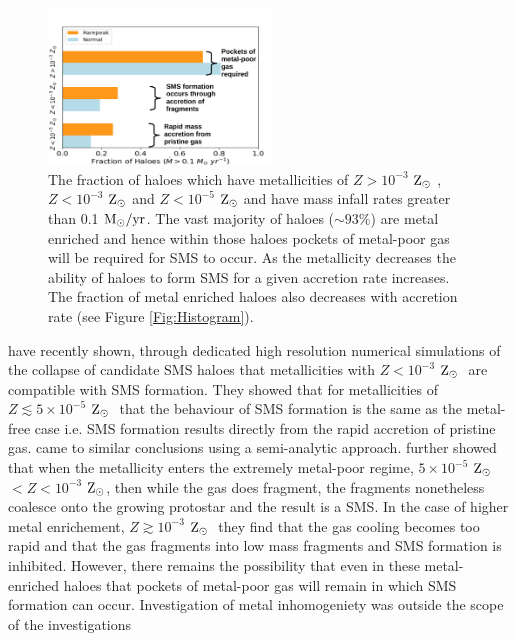 \documentclass[graphics, twocolumn, usenatbib]{mn2e}
\newcommand{\msolaryrc} {$\rm{M_{\odot}/yr}$}
\newcommand{\zsolar} {$\rm{Z_{\odot}}~$}
\newcommand{\zsolarc} {$\rm{Z_{\odot}}$}
\begin{document}
\begin{figure}
   \centering 
\includegraphics[width=0.525\textwidth]{FIGURES/FinalPlot-crop.pdf}
\caption{The fraction of haloes which have metallicities of $Z > 10^{-3}$ \zsolar,
  $Z < 10^{-3}$ \zsolar and $ Z < 10^{-5}$ \zsolar and have mass infall rates greater than
  0.1 \msolaryrc. The vast majority of haloes ($\sim 93$\%) are metal enriched and hence within
  those haloes pockets of metal-poor gas will be required for SMS to occur. As the metallicity
  decreases the ability of haloes to form SMS for a given accretion rate increases. The fraction of
  metal enriched haloes also decreases with accretion rate (see Figure \ref{Fig:Histogram}).} \label{Fig:Fractions}
\end{figure}
\indent \cite{Chon_2020} have recently shown, through dedicated high resolution numerical simulations
of the collapse of candidate SMS haloes that metallicities with $Z < 10^{-3}$ \zsolar
are compatible with SMS formation. They showed that for metallicities of $Z \lesssim 5 \times 10^{-5}$ \zsolar
that the behaviour of SMS formation is the same as the metal-free case i.e. SMS formation results
directly from the rapid accretion of pristine gas. \cite{Tagawa_2020} came to similar conclusions
using a semi-analytic approach. \cite{Chon_2020} further showed that when the metallicity enters the
extremely metal-poor regime, $5 \times 10^{-5}$ \zsolar $ < Z < 10^{-3}$ \zsolarc, then while
the gas does fragment, the fragments nonetheless coalesce onto the growing protostar and the
result is a SMS. In the case of higher metal enrichement,  $Z \gtrsim 10^{-3}$ \zsolar
they find that the gas cooling becomes too rapid and that the gas fragments into low mass fragments
and SMS formation is inhibited. However, there remains the possibility that even in these
metal-enriched haloes that pockets of metal-poor gas will remain in which SMS formation can occur.
Investigation of metal inhomogeniety was outside the scope of the \cite{Chon_2020} investigations
\end{document}
